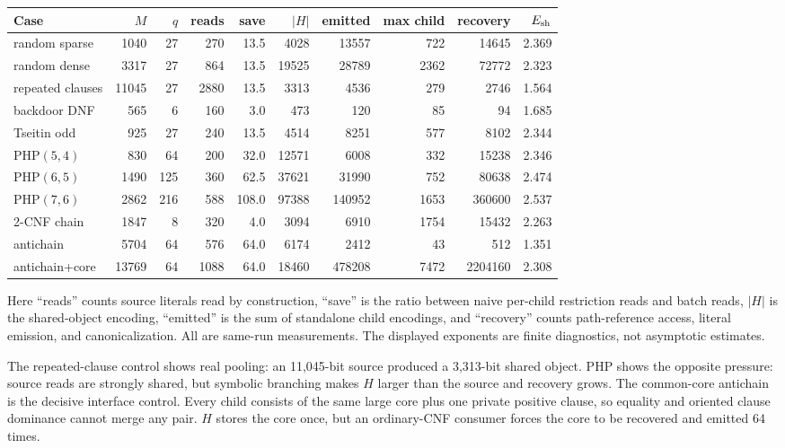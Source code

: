 \documentclass[11pt]{article}
\begin{document}
\begin{center}
\scriptsize
\setlength{\tabcolsep}{2.4pt}
\begin{tabular}{lrrrrrrrrr}
\toprule
Case & $M$ & $q$ & reads & save & $|H|$ & emitted & max child & recovery & $E_{\rm sh}$\\
\midrule
random sparse & 1040 & 27 & 270 & 13.5 & 4028 & 13557 & 722 & 14645 & 2.369\\
random dense & 3317 & 27 & 864 & 13.5 & 19525 & 28789 & 2362 & 72772 & 2.323\\
repeated clauses & 11045 & 27 & 2880 & 13.5 & 3313 & 4536 & 279 & 2746 & 1.564\\
backdoor DNF & 565 & 6 & 160 & 3.0 & 473 & 120 & 85 & 94 & 1.685\\
Tseitin odd & 925 & 27 & 240 & 13.5 & 4514 & 8251 & 577 & 8102 & 2.344\\
PHP$(5,4)$ & 830 & 64 & 200 & 32.0 & 12571 & 6008 & 332 & 15238 & 2.346\\
PHP$(6,5)$ & 1490 & 125 & 360 & 62.5 & 37621 & 31990 & 752 & 80638 & 2.474\\
PHP$(7,6)$ & 2862 & 216 & 588 & 108.0 & 97388 & 140952 & 1653 & 360600 & 2.537\\
2-CNF chain & 1847 & 8 & 320 & 4.0 & 3094 & 6910 & 1754 & 15432 & 2.263\\
antichain & 5704 & 64 & 576 & 64.0 & 6174 & 2412 & 43 & 512 & 1.351\\
antichain+core & 13769 & 64 & 1088 & 64.0 & 18460 & 478208 & 7472 & 2204160 & 2.308\\
\bottomrule
\end{tabular}
\end{center}

Here ``reads'' counts source literals read by construction, ``save'' is the
ratio between naive per-child restriction reads and batch reads, $|H|$ is the
shared-object encoding, ``emitted'' is the sum of standalone child encodings,
and ``recovery'' counts path-reference access, literal emission, and
canonicalization.  All are same-run measurements.  The displayed exponents
are finite diagnostics, not asymptotic estimates.

The repeated-clause control shows real pooling: an 11,045-bit source produced
a 3,313-bit shared object.  PHP shows the opposite pressure: source reads are
strongly shared, but symbolic branching makes $H$ larger than the source and
recovery grows.  The common-core antichain is the decisive interface control.
Every child consists of the same large core plus one private positive clause,
so equality and oriented clause dominance cannot merge any pair.  $H$ stores
the core once, but an ordinary-CNF consumer forces the core to be recovered
and emitted 64 times.
\end{document}
